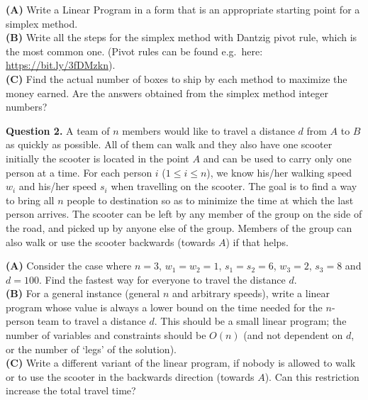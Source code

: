 \documentclass[jou]{apa6}
\begin{document}
\vspace{4pt}
{\bf (A)} Write a Linear Program in a form that is 
an appropriate starting point for a simplex method.\\
{\bf (B)} Write all the steps for the simplex method with Dantzig pivot rule, which is the most common one. (Pivot rules 
can be found e.g.\ here: \url{https://bit.ly/3fDMzkn}).\\
{\bf (C)} Find the actual number of boxes to ship by each method to maximize the money earned.
Are the answers obtained from the simplex  method integer numbers?




\vspace{10pt}
{\bf Question 2.} A team of $n$ members would like to travel a distance $d$ from $A$ to $B$
as quickly as possible. All of them can walk and they also have one scooter \textendash{} initially 
the scooter is located in the point $A$ and can be used to carry only one person at a time.  
For each person $i$ ($1 \leq i \leq n$), we
know his/her walking speed $w_i$ and his/her speed $s_i$ when travelling on the scooter.
The goal is to find a way to bring all $n$ people to destination so as to minimize the
time at which the last person arrives. The scooter can be left by any member of the
group on the side of the road, and picked up by anyone else of the group. Members
of the group can also walk or use the scooter backwards (towards $A$) if that helps.

\vspace{4pt}
{\bf (A)} Consider the case where $n = 3$, $w_1 = w_2 = 1$, $s_1 = s_2 = 6$, $w_3 = 2$, $s_3 = 8$ and
$d = 100$. Find the fastest way for everyone to travel the distance $d$.\\
{\bf (B)} For a general instance (general $n$ and arbitrary speeds), write a linear program
whose value is always a lower bound on the time needed for the $n$-person team
to travel a distance $d$. This should be a small linear program; the number
of variables and constraints should be $O(n)$ (and not dependent on $d$, or the
number of `legs' of the solution).\\
{\bf (C)} Write a different variant of the linear program, if nobody is allowed 
to walk or to use the scooter in the backwards direction (towards $A$). 
Can this restriction increase the total travel time?
\end{document}
